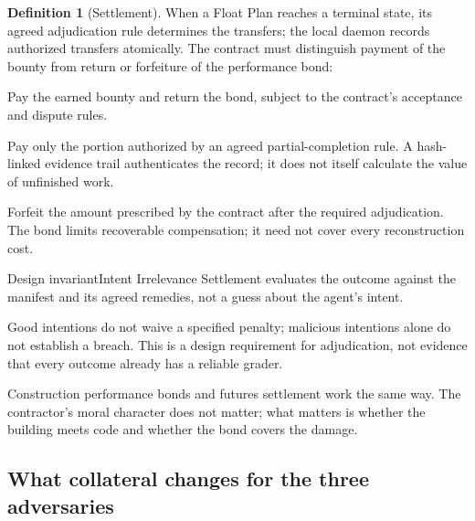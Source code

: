 \documentclass[11pt,a4paper]{article}
\theoremstyle{definition}
\newtheorem{definition}{Definition}[section]
\theoremstyle{remark}
\begin{document}
\begin{definition}[Settlement]\label{def:settlement}
\setlength{\parskip}{4pt plus 1pt}
When a Float Plan reaches a terminal state, its agreed adjudication rule determines the transfers; the local daemon records authorized transfers atomically. The contract must distinguish payment of the bounty from return or forfeiture of the performance bond:
\begin{description}[nosep]
  \item[Success:] Pay the earned bounty and return the bond, subject to the contract's acceptance and dispute rules.
  \item[Partial completion:] Pay only the portion authorized by an agreed partial-completion rule. A hash-linked evidence trail authenticates the record; it does not itself calculate the value of unfinished work.
  \item[Breach:] Forfeit the amount prescribed by the contract after the required adjudication. The bond limits recoverable compensation; it need not cover every reconstruction cost.
\end{description}
\end{definition}

\begin{pdclaim}{Design invariant}{Intent Irrelevance}
\setlength{\parskip}{4pt plus 1pt}
\label{prop:intent}
Settlement evaluates the outcome against the manifest and its agreed remedies, not a guess about the agent's intent.

Good intentions do not waive a specified penalty; malicious intentions alone do not establish a breach. This is a design requirement for adjudication, not evidence that every outcome already has a reliable grader.
\end{pdclaim}

Construction performance bonds and futures settlement work the same way. The contractor's moral character does not matter; what matters is whether the building meets code and whether the bond covers the damage.

\subsection{What collateral changes for the three adversaries}

\end{document}
